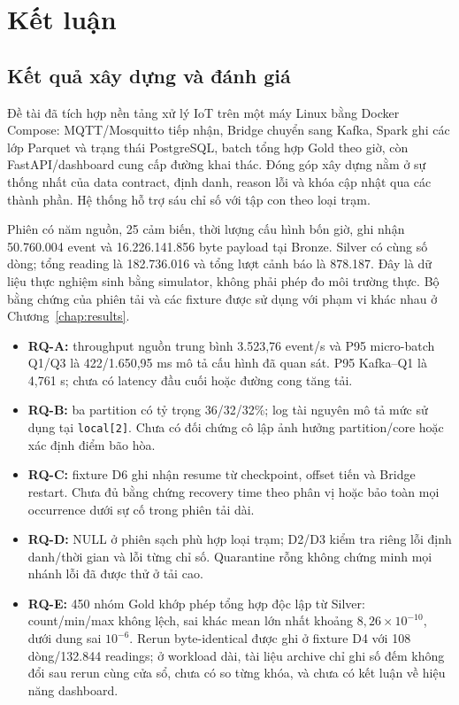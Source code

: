 \chapter{Kết luận}
\label{chap:conclusion}

\section{Kết quả xây dựng và đánh giá}

Đề tài đã tích hợp nền tảng xử lý IoT trên một máy Linux bằng Docker
Compose: MQTT/Mosquitto tiếp nhận, Bridge chuyển sang Kafka, Spark ghi các
lớp Parquet và trạng thái PostgreSQL, batch tổng hợp Gold theo giờ, còn
FastAPI/dashboard cung cấp đường khai thác. Đóng góp xây dựng nằm ở sự
thống nhất của data contract, định danh, reason lỗi và khóa cập nhật qua
các thành phần. Hệ thống hỗ trợ sáu chỉ số với tập con theo loại trạm.

Phiên có năm nguồn, 25 cảm biến, thời lượng cấu hình bốn giờ, ghi nhận
50.760.004 event và 16.226.141.856 byte payload tại Bronze. Silver có cùng
số dòng; tổng reading là 182.736.016 và tổng lượt cảnh báo là 878.187.
Đây là dữ liệu thực nghiệm sinh bằng simulator, không phải phép đo môi
trường thực. Bộ bằng chứng của phiên tải và các fixture được sử dụng
với phạm vi khác nhau ở Chương~\ref{chap:results}.

\begin{itemize}
 \item \textbf{RQ-A:} throughput nguồn trung bình 3.523,76 event/s và P95
 micro-batch Q1/Q3 là 422/1.650,95 ms mô tả cấu hình đã quan sát. P95
 Kafka--Q1 là 4,761 s; chưa có latency đầu cuối hoặc đường cong tăng tải.
 \item \textbf{RQ-B:} ba partition có tỷ trọng 36/32/32\%; log tài nguyên
 mô tả mức sử dụng tại \texttt{local[2]}. Chưa có đối chứng cô lập ảnh
 hưởng partition/core hoặc xác định điểm bão hòa.
 \item \textbf{RQ-C:} fixture D6 ghi nhận resume từ checkpoint, offset
 tiến và Bridge restart. Chưa đủ bằng chứng recovery time theo phân vị
 hoặc bảo toàn mọi occurrence dưới sự cố trong phiên tải dài.
 \item \textbf{RQ-D:} NULL ở phiên sạch phù hợp loại trạm; D2/D3 kiểm tra
 riêng lỗi định danh/thời gian và lỗi từng chỉ số. Quarantine rỗng không
 chứng minh mọi nhánh lỗi đã được thử ở tải cao.
 \item \textbf{RQ-E:} 450 nhóm Gold khớp phép tổng hợp độc lập từ Silver:
 count/min/max không lệch, sai khác mean lớn nhất khoảng
 $8,26\times10^{-10}$, dưới dung sai $10^{-6}$. Rerun byte-identical được
 ghi ở fixture D4 với 108 dòng/132.844 readings; ở workload dài, tài liệu
 archive chỉ ghi số đếm không đổi sau rerun cùng cửa sổ, chưa có so từng
 khóa, và chưa có kết luận về hiệu năng dashboard.
\end{itemize}

